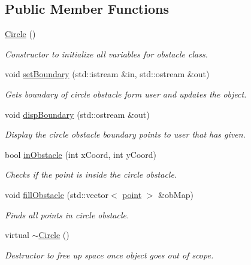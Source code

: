 \subsection*{Public Member Functions}
\begin{DoxyCompactItemize}
\item 
\hyperlink{classCircle_ad1ecfcfc7bf34529c6a6d6c448bf70fe}{Circle} ()
\begin{DoxyCompactList}\small\item\em Constructor to initialize all variables for obstacle class. \end{DoxyCompactList}\item 
void \hyperlink{classCircle_ad74925eb7a24bebd81cbef04ee174e6e}{set\+Boundary} (std\+::istream \&in, std\+::ostream \&out)
\begin{DoxyCompactList}\small\item\em Gets boundary of circle obstacle form user and updates the object. \end{DoxyCompactList}\item 
void \hyperlink{classCircle_a4c8e70958920c83bffcf316e3f3245b0}{disp\+Boundary} (std\+::ostream \&out)
\begin{DoxyCompactList}\small\item\em Display the circle obstacle boundary points to user that has given. \end{DoxyCompactList}\item 
bool \hyperlink{classCircle_ab2f11acd5263f4918b43608bc8eeb076}{in\+Obstacle} (int x\+Coord, int y\+Coord)
\begin{DoxyCompactList}\small\item\em Checks if the point is inside the circle obstacle. \end{DoxyCompactList}\item 
void \hyperlink{classCircle_a9e6224627d024141c53262844230fcbd}{fill\+Obstacle} (std\+::vector$<$ \hyperlink{structpoint}{point} $>$ \&ob\+Map)
\begin{DoxyCompactList}\small\item\em Finds all points in circle obstacle. \end{DoxyCompactList}\item 
virtual \hyperlink{classCircle_ae3f30436e645d73e368e8ee55f8d1650}{$\sim$\+Circle} ()
\begin{DoxyCompactList}\small\item\em Destructor to free up space once object goes out of scope. \end{DoxyCompactList}\end{DoxyCompactItemize}


